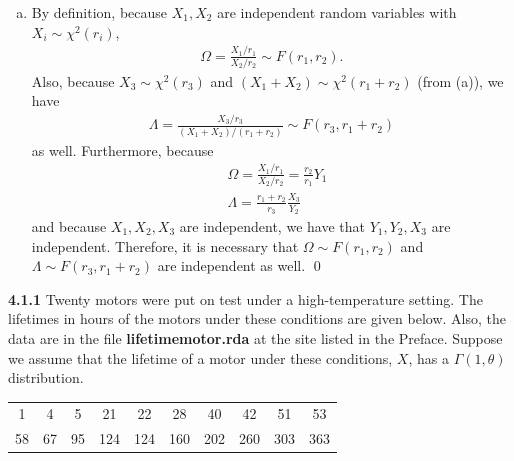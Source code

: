 \documentclass{book}
\theoremstyle{definition}
\newcommand{\f}[2]{\frac{#1}{#2}}
\begin{document}
\begin{enumerate}[(a)]
	
	
	
	
	\item By definition, because $X_1, X_2$ are independent random variables with $X_i \sim \chi^2(r_i)$, 
	\begin{align}
	\Omega = \f{X_1/r_1}{X_2/r_2} \sim F(r_1, r_2).
	\end{align}
	Also, because $X_3 \sim \chi^2(r_3)$ and $(X_1 + X_2) \sim \chi^2(r_1 + r_2)$ (from (a)), we have
	\begin{align}
	\Lambda = \f{X_3/r_3}{(X_1 + X_2)/(r_1 + r_2)} \sim F(r_3, r_1 + r_2)
	\end{align}
	as well. Furthermore, because 
	\begin{align}
	&\Omega = \f{X_1/r_1}{X_2/r_2} = \f{r_2}{r_1}Y_1\\
	&\Lambda = \f{r_1+r_2}{r_3}\f{X_3}{Y_2}
	\end{align}
	and because $X_1, X_2, X_3$ are independent, we have that $Y_1, Y_2, X_3$ are independent. Therefore, it is necessary that $\Omega \sim F(r_1, r_2)$ and $\Lambda \sim F(r_3, r_1 + r_2)$ are independent as well. \qed
	
\end{enumerate}








\newpage




\textbf{4.1.1} Twenty motors were put on test under a high-temperature setting. The
lifetimes in hours of the motors under these conditions are given below. Also, the
data are in the file \textbf{lifetimemotor.rda} at the site listed in the Preface. Suppose
we assume that the lifetime of a motor under these conditions, $X$, has a $\Gamma(1, \theta)$
distribution.\\

\begin{tabular}{c c c c c c c c c c }
	1 &4& 5& 21& 22& 28& 40& 42& 51& 53\\
	58 &67& 95& 124& 124& 160& 202& 260& 303& 363
\end{tabular}
\end{document}
